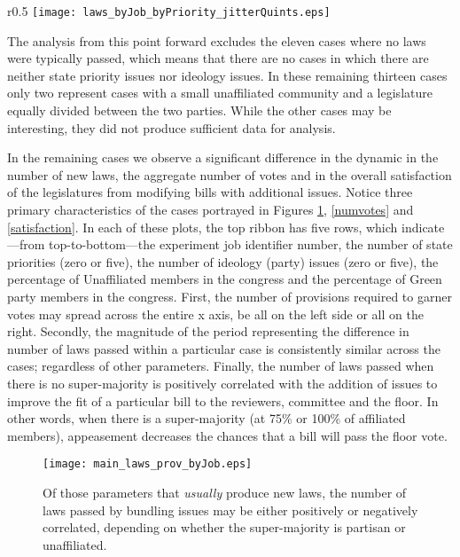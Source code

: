 \documentclass[pdftex,12pt]{llncs}
\begin{document}
\begin{wrapfigure}{r}{0.5\textwidth}
  \texttt{[image: laws\_byJob\_byPriority\_jitterQuints.eps]}
\caption[ ]{Model runs with no ideology issues and no state priorities consistently produce no new laws, but other structural conditions may also produce no laws.}
 \label{bypriority}
  \vspace{-1cm}
\end{wrapfigure}

The analysis from this point forward excludes the eleven cases where no laws were typically passed, which means that there are no cases in which there are neither state priority issues nor ideology issues. 
In these remaining thirteen cases only two represent cases with a small unaffiliated community and a legislature equally divided between the two parties. 
While the other cases may be interesting, they did not produce sufficient data for analysis.

In the remaining cases we observe a significant difference in the dynamic in the number of new laws, the aggregate number of votes and in the overall satisfaction of the legislatures from modifying bills with additional issues.
Notice three primary characteristics of the cases portrayed in Figures \ref{numlaws}, \ref{numvotes} and \ref{satisfaction}. 
In each of these plots, the top ribbon has five rows, which indicate---from top-to-bottom---the experiment job identifier number, the number of state priorities (zero or five), the number of ideology (party) issues (zero or five), the percentage of Unaffiliated members in the congress and the percentage of Green party members in the congress.
First, the number of provisions required to garner votes may spread across the entire x axis, be all on the left side or all on the right. 
Secondly, the magnitude of the period representing the difference in number of laws passed within a particular case is consistently similar across the cases; regardless of other parameters. 
Finally, the number of laws passed when there is no super-majority is positively correlated with the addition of issues to improve the fit of a particular bill to the reviewers, committee and the floor. 
In other words, when there is a super-majority (at 75\% or 100\% of affiliated members), appeasement decreases the chances that a bill will pass the floor vote.


\begin{figure}%
 \centering
  \texttt{[image: main\_laws\_prov\_byJob.eps]}
\caption[ ]{Of those parameters that \textit{usually} produce new laws, the number of laws passed by bundling issues may be either positively or negatively correlated, depending on whether the super-majority is partisan or unaffiliated.}
 \label{numlaws}
\end{figure}
\end{document}
